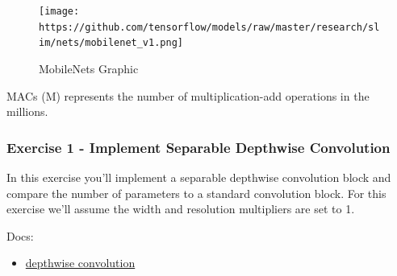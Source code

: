 \documentclass[11pt]{article}
\providecommand{\tightlist}{%
      \setlength{\itemsep}{0pt}\setlength{\parskip}{0pt}}
\begin{document}
\begin{figure}
\centering
\texttt{[image: https://github.com/tensorflow/models/raw/master/research/slim/nets/mobilenet\_v1.png]}
\caption{MobileNets Graphic}
\end{figure}

    MACs (M) represents the number of multiplication-add operations in the
millions.

    \hypertarget{exercise-1---implement-separable-depthwise-convolution}{%
\subsubsection{Exercise 1 - Implement Separable Depthwise
Convolution}\label{exercise-1---implement-separable-depthwise-convolution}}

In this exercise you'll implement a separable depthwise convolution
block and compare the number of parameters to a standard convolution
block. For this exercise we'll assume the width and resolution
multipliers are set to 1.

Docs:

\begin{itemize}
\tightlist
\item
  \href{https://www.tensorflow.org/api_docs/python/tf/nn/depthwise_conv2d}{depthwise
  convolution}
\end{itemize}
\end{document}

